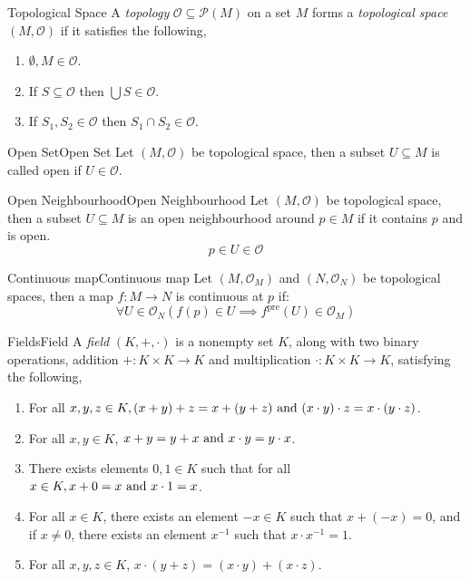 \documentclass{article}
\newcommand{\tp}{\mathcal{O}}
\newcommand{\pset}[1]{\mathcal{P}(#1)}
\begin{document}
\begin{definition}{Topological Space}{}
    A \emph{topology} $\tp \subseteq \pset{M}$ on a set $M$ forms a \emph{topological space} $(M, \tp)$ if it satisfies the following,

    \begin{enumerate}[label=(\roman*)]
        \item $\emptyset, M \in \tp$.
        \item If $S \subseteq \tp$ then $\bigcup S \in \tp$.
        \item If $S_1, S_2 \in \tp$ then $S_1 \cap S_2 \in \tp$.
    \end{enumerate}
\end{definition}

\begin{terminology}{Open Set}{Open Set}
    Let $(M, \tp)$ be topological space, then a subset $U \subseteq M$ is called open if $U \in \tp$.
\end{terminology}

\begin{terminology}{Open Neighbourhood}{Open Neighbourhood}
    Let $(M, \tp)$ be topological space, then a subset $U \subseteq M$ is an open neighbourhood around $p \in M$ if it contains $p$ and is open.
    $$p \in U \in \tp$$
\end{terminology}

\begin{definition}{Continuous map}{Continuous map}
    Let $(M, \tp_M)$ and $(N, \tp_N)$ be topological spaces, then a map $f: M \to N$ is continuous at $p$ if:
    $$\forall U \in \tp_N \left(f(p) \in U \implies f^{\text{pre}}(U) \in \tp_M\right)$$
\end{definition}

\begin{definition}{Fields}{Field}
    A \emph{field} $\left(K, +, \cdot\right)$ is a nonempty set $K$, along with two binary operations,
    addition $+: K \times K \to K$
    and multiplication $\cdot: K \times K \to K$,
    satisfying the following,

    \begin{enumerate}[label=(\roman*)]
        \item  For all $x, y, z \in K, (x + y) + z = x + (y + z) \text{ and } (x \cdot y) \cdot z = x \cdot (y \cdot z)$.
        \item  For all $x, y \in K$, $x + y = y + x \text{ and } x \cdot y = y \cdot x$.
        \item  There exists elements $0, 1 \in K$ such that for all $x \in K, x + 0 = x \text{ and } x \cdot 1 = x$.
        \item  For all $x \in K$, there exists an element $-x \in K$ such that $x + (-x) = 0$, and if $x \neq 0$, there exists an element $x^{-1}$ such that $x \cdot x^{-1} = 1$.
        \item  For all $x, y, z \in K$, $x \cdot (y + z) = (x \cdot y) + (x \cdot z)$.
    \end{enumerate}
\end{definition}
\end{document}
